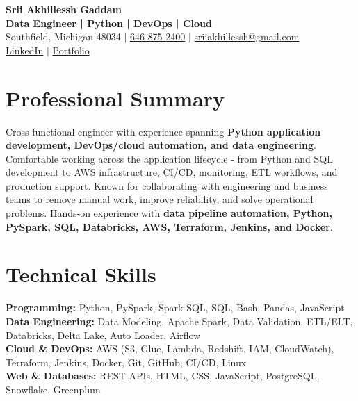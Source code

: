 \documentclass[letterpaper,10pt]{article}
\begin{document}
\fontsize{9.35pt}{10.45pt}\selectfont

\begin{center}
    {\LARGE \textbf{Srii Akhillessh Gaddam}} \\[-1pt]
    \textbf{Data Engineer | Python | DevOps | Cloud} \\[2pt]
    Southfield, Michigan 48034 $|$
    \href{tel:6468752400}{646-875-2400} $|$
    \href{mailto:sriiakhillessh@gmail.com}{sriiakhillessh@gmail.com} \\[1pt]
    \href{https://www.linkedin.com/in/srii-akhiilessh-gaddam-b48668191/}{LinkedIn} $|$
    \href{https://sriiakhillesshg.github.io/portfolio/}{Portfolio}
\end{center}
\vspace{-8pt}

\section{Professional Summary}
\small{Cross-functional engineer with experience spanning \textbf{Python application development, DevOps/cloud automation, and data engineering}. Comfortable working across the application lifecycle - from Python and SQL development to AWS infrastructure, CI/CD, monitoring, ETL workflows, and production support. Known for collaborating with engineering and business teams to remove manual work, improve reliability, and solve operational problems. Hands-on experience with \textbf{data pipeline automation, Python, PySpark, SQL, Databricks, AWS, Terraform, Jenkins, and Docker}.}

\section{Technical Skills}
\small{
\textbf{Programming:} Python, PySpark, Spark SQL, SQL, Bash, Pandas, JavaScript \\
\textbf{Data Engineering:} Data Modeling, Apache Spark, Data Validation, ETL/ELT, Databricks, Delta Lake, Auto Loader, Airflow \\
\textbf{Cloud \& DevOps:} AWS (S3, Glue, Lambda, Redshift, IAM, CloudWatch), Terraform, Jenkins, Docker, Git, GitHub, CI/CD, Linux \\
\textbf{Web \& Databases:} REST APIs, HTML, CSS, JavaScript, PostgreSQL, Snowflake, Greenplum
}

\end{document}
